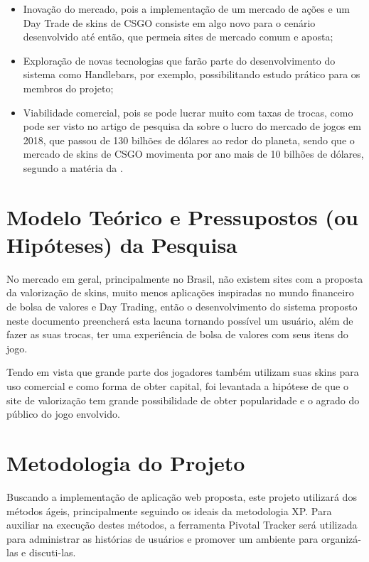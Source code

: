 \begin{itemize}
	\item Inovação do mercado, pois a implementação de um mercado de ações e um Day Trade de skins de CSGO consiste em algo novo para o cenário desenvolvido até então, que permeia sites de mercado comum e aposta;
	\item Exploração de novas tecnologias que farão parte do desenvolvimento do sistema como Handlebars, por exemplo, possibilitando estudo prático para os membros do projeto;
	\item Viabilidade comercial, pois se pode lucrar muito com taxas de trocas, como pode ser visto no artigo de pesquisa da  sobre o lucro do mercado de jogos em 2018, que passou de 130 bilhões de dólares ao redor do planeta, sendo que o mercado de skins de CSGO movimenta por ano mais de 10 bilhões de dólares, segundo a matéria da .
\end{itemize} 

\chapter{Modelo Teórico e Pressupostos (ou Hipóteses) da Pesquisa}
No mercado em geral, principalmente no Brasil, não existem sites com a proposta da valorização de skins, muito menos aplicações inspiradas no mundo financeiro de bolsa de valores e Day Trading, então o desenvolvimento do sistema proposto neste documento preencherá esta lacuna tornando possível um usuário, além de fazer as suas trocas, ter uma experiência de bolsa de valores com seus itens do jogo. 

Tendo em vista que grande parte dos jogadores também utilizam suas skins para uso comercial e como forma de obter capital, foi levantada a hipótese de que o site de valorização tem grande possibilidade de obter popularidade e o agrado do público do jogo envolvido.

\chapter{Metodologia do Projeto}
Buscando a implementação de aplicação web proposta, este projeto utilizará dos métodos ágeis, principalmente seguindo os ideais da metodologia XP. Para auxiliar na execução destes métodos, a ferramenta Pivotal Tracker será utilizada para administrar as histórias de usuários e promover um ambiente para organizá-las e discuti-las.


